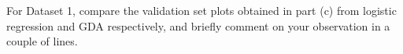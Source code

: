 \item {}
For Dataset 1, compare the validation set plots obtained in part (c)
from logistic regression and GDA respectively, and briefly comment on your observation
in a couple of lines.

